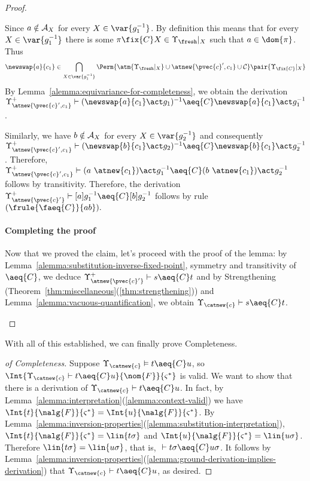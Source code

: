 \begin{proof}
\begin{enumerate}
\begin{itemize}
             Since $a\notin {\cal A}_X$ for every $X\in\var{g_1^{-1}}$. By definition this means that for every $X\in\var{g_1^{-1}}$ there is some $\pi\fix{C} X\in\Upsilon_{\fresh}|_X$ such that $a\in \dom{\pi}$. Thus
              \[
                     \newswap{a}{c_1}\in \bigcap_{X\in\var{g_1^{-1}}}\Perm{\atm{\Upsilon_{\fresh}|_{X}}\cup\atnew{\pvec{c}',c_1}\cup{\cal C}}\pair{\Upsilon_{\fix{C}}|_{X}}
              \]
              By Lemma~\ref{alemma:equivariance-for-completeness},  we obtain the derivation $\Upsilon^+_{\atnew{\pvec{c}',c_1}}\vdash (\newswap{a}{c_1}\act g_1)^{-1} \aeq{C} \newswap{a}{c_1}\act g_1^{-1}$.

              Similarly, we have $b\notin {\cal A}_X$ for every $X\in\var{g_2^{-1}}$ and consequently $\Upsilon^+_{\atnew{\pvec{c}',c_1}}\vdash (\newswap{b}{c_1}\act g_2)^{-1} \aeq{C} \newswap{b}{c_1}\act g_2^{-1}$. Therefore, $\Upsilon^+_{\atnew{\pvec{c}',c_1}}\vdash (a \ \atnew{c_1})\act g_1^{-1} \aeq{C} (b \ \atnew{c_1})\act g_2^{-1}$ follows by transitivity. Therefore, the derivation $ \Upsilon^+_{\atnew{\pvec{c}'}} \vdash [a]g_1^{-1} \aeq{C} [b]g_2^{-1}$ follows by rule $(\frule{\faeq{C}}{ab}).$
         \end{itemize}

        \paragraph*{Completing the proof} Now that we proved the claim, let's proceed with the proof of the lemma: by Lemma~\ref{alemma:substitution-inverse-fixed-point}, symmetry and transitivity of $\aeq{C}$, we deduce $\Upsilon^+_{\atnew{\pvec{c}'}}\vdash s\aeq{C} t$ and by Strengthening (Theorem~\ref{thm:miscellaneous}(\ref{thm:strengthening})) and Lemma~\ref{alemma:vacuous-quantification}, we obtain $\Upsilon_{\catnew{c}}\vdash s\aeq{C} t$.
    \end{enumerate}
\end{proof}

With all of this established, we can finally prove Completeness.

\begin{proof}[of Completeness]
    Suppose $\Upsilon_{\catnew{c}} \vDash t\aeq{C} u$, so $\Int{\Upsilon_{\catnew{c}} \vdash t\aeq{C} u}{\nom{F}}{\varsigma^*}$ is valid. We want to show that there is a derivation of $\Upsilon_{\catnew{c}} \vdash t\aeq{C} u$. In fact, by Lemma~\ref{alemma:interpretation}(\ref{alemma:context-valid}) we have $\Int{t}{\nalg{F}}{\varsigma^*} = \Int{u}{\nalg{F}}{\varsigma^*}$. By Lemma~\ref{alemma:inversion-properties}(\ref{alemma:substitution-interpretation}), $\Int{t}{\nalg{F}}{\varsigma^*} = \lin{t\sigma}$ and $\Int{u}{\nalg{F}}{\varsigma^*} = \lin{u\sigma}$. Therefore $\lin{t\sigma} = \lin{u\sigma}$, that is, $~\vdash t\sigma \aeq{C} u\sigma$. It follows by Lemma~\ref{alemma:inversion-properties}(\ref{alemma:ground-derivation-implies-derivation}) that $\Upsilon_{\catnew{c}} \vdash t\aeq{C} u$, as desired.
\end{proof}



